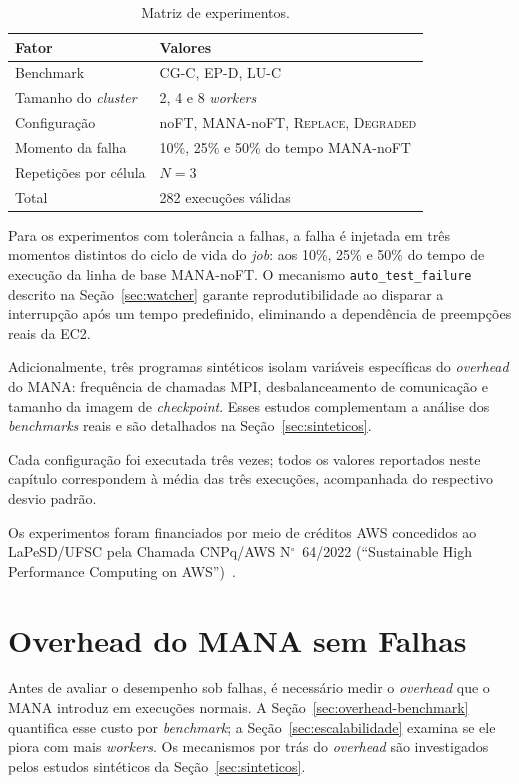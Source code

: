\begin{table}[htb]
  \caption{Matriz de experimentos.}
  \label{tab:matriz}
  \centering
  \begin{tabular}{ll}
    \toprule
    Fator & Valores \\
    \midrule
    Benchmark             & CG-C, EP-D, LU-C \\
    Tamanho do \textit{cluster}    & 2, 4 e 8 \textit{workers} \\
    Configuração          & noFT, MANA-noFT, \textsc{Replace}, \textsc{Degraded} \\
    Momento da falha      & 10\%, 25\% e 50\% do tempo MANA-noFT \\
    Repetições por célula & $N = 3$ \\
    \midrule
    Total & 282 execuções válidas \\
    \bottomrule
  \end{tabular}
\end{table}

Para os experimentos com tolerância a falhas, a falha é injetada em três momentos
distintos do ciclo de vida do \textit{job}: aos 10\%, 25\% e 50\% do tempo de execução
da linha de base MANA-noFT. O mecanismo \texttt{auto\_test\_failure} descrito na
Seção~\ref{sec:watcher} garante reprodutibilidade ao disparar a interrupção após um
tempo predefinido, eliminando a dependência de preempções reais da EC2.

Adicionalmente, três programas sintéticos isolam variáveis específicas do
\textit{overhead} do MANA: frequência de chamadas MPI, desbalanceamento de comunicação
e tamanho da imagem de \textit{checkpoint}. Esses estudos complementam a análise dos
\textit{benchmarks} reais e são detalhados na Seção~\ref{sec:sinteticos}.

Cada configuração foi executada três vezes; todos os valores reportados neste capítulo
correspondem à média das três execuções, acompanhada do respectivo desvio padrão.

Os experimentos foram financiados por meio de créditos AWS concedidos ao LaPeSD/UFSC
pela Chamada CNPq/AWS N$^{\circ}$~64/2022 (``Sustainable High Performance Computing
on AWS'')~\cite{soda2025wcc}.

\section{Overhead do MANA sem Falhas}
\label{sec:overhead}

Antes de avaliar o desempenho sob falhas, é necessário medir o \textit{overhead} que
o MANA introduz em execuções normais. A Seção~\ref{sec:overhead-benchmark} quantifica
esse custo por \textit{benchmark}; a Seção~\ref{sec:escalabilidade} examina se ele
piora com mais \textit{workers}. Os mecanismos por trás do \textit{overhead} são
investigados pelos estudos sintéticos da Seção~\ref{sec:sinteticos}.


